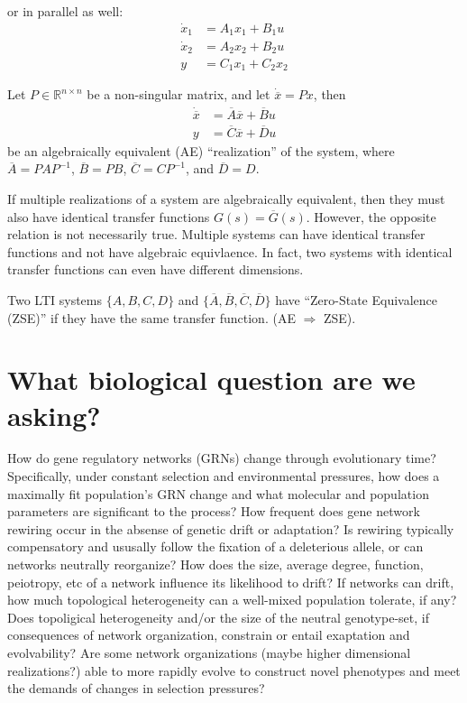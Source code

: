 \documentclass[a4paper, 11 pt]{article}
\begin{document}
or in parallel as well:
\begin{equation}
  \begin{split}
    \dot{x}_{1} &= A_{1}x_{1} + B_{1}u \\
    \dot{x}_{2} &= A_{2}x_{2} + B_{2}u \\
    y &= C_{1}x_{1} + C_{2}x_{2}
\end{split}
\end{equation}

Let $P \in \mathbb{R}^{n \times n}$ be a non-singular matrix, and let $\dot{\overline{x}} = Px$, then
\begin{equation}
  \begin{split}
  \dot{\overline{x}} &= \overline{A}\overline{x} + \overline{B}u \\
  y &= \overline{C}\overline{x} + \overline{D}u
  \end{split}
\end{equation}
be an algebraically equivalent (AE) ``realization'' of the system, where $\overline{A} = PAP^{-1}$, $\overline{B} = PB$, $\overline{C} = CP^{-1}$, and $\overline{D} = D$.

If multiple realizations of a system are algebraically equivalent, then they must also have identical transfer functions $G(s) = \overline{G}(s)$. However, the opposite relation is not necessarily true. Multiple systems can have identical transfer functions and not have algebraic equivlaence. In fact, two systems with identical transfer functions can even have different dimensions. 

Two LTI systems $\{A, B, C, D\}$ and $\{\overline{A}, \overline{B}, \overline{C}, \overline{D} \}$ have ``Zero-State Equivalence (ZSE)'' if they have the same transfer function. (AE $\Rightarrow$ ZSE). 



\section{What biological question are we asking?}
How do gene regulatory networks (GRNs) change through evolutionary time? Specifically, under constant selection and environmental pressures, how does a maximally fit population's GRN change and what molecular and population parameters are significant to the process? How frequent does gene network rewiring occur in the absense of genetic drift or adaptation? Is rewiring typically compensatory and ususally follow the fixation of a deleterious allele, or can networks neutrally reorganize? How does the size, average degree, function, peiotropy, etc of a network influence its likelihood to drift? If networks can drift, how much topological heterogeneity can a well-mixed population tolerate, if any? Does topoligical heterogeneity and/or the size of the neutral genotype-set, if consequences of network organization, constrain or entail exaptation and evolvability? Are some network organizations (maybe higher dimensional realizations?) able to more rapidly evolve to construct novel phenotypes and meet the demands of changes in selection pressures?
\end{document}
